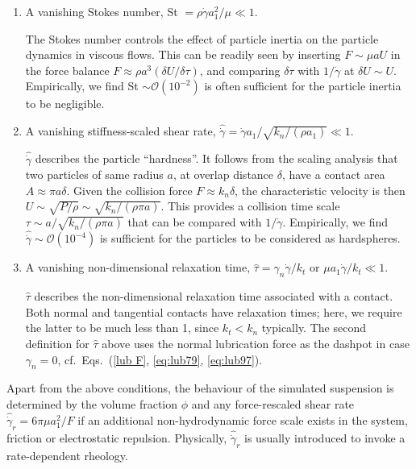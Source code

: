 \begin{enumerate}

\item A vanishing Stokes number, St $=\rho \dot{\gamma} a_1^2/\mu \ll 1$.

  The Stokes number controls the effect of particle inertia on the particle dynamics in viscous flows. This can be readily seen by inserting $F \sim \mu a U$ in the force balance $F \approx \rho a^3 (\delta U/ \delta \tau)$, and comparing $\delta \tau$ with $1/\dot{\gamma}$ at $\delta U \sim U$. Empirically, we find St $\sim \mathcal{O}(10^{-2})$ is often sufficient for the particle inertia to be negligible.
  
\item A vanishing stiffness-scaled shear rate, $\hat{\dot{\gamma}}=\dot{\gamma}a_1/\sqrt{k_n/(\rho a_1)} \ll 1$.

  $\hat{\dot{\gamma}}$ describes the particle ``hardness''. It follows from the scaling analysis that two particles of same radius $a$, at overlap distance $\delta$, have a contact area $A \approx \pi a \delta$. Given the collision force $F \approx k_n \delta$, the characteristic velocity is then $U \sim \sqrt{P/\rho} \sim \sqrt{k_n/(\rho \pi a)}$. This provides a collision time scale $\tau \sim a/\sqrt{k_n/(\rho \pi a)}$ that can be compared with $1/\dot{\gamma}$. Empirically, we find $\hat{\dot{\gamma}} \sim \mathcal{O}(10^{-4})$ is sufficient for the particles to be considered as hardspheres.
  
\item A vanishing non-dimensional relaxation time, $\hat{\tau}=\gamma_n\dot{\gamma}/k_t$ or $\mu a_1 \dot{\gamma}/k_t \ll 1$.

  $\hat{\tau}$ describes the non-dimensional relaxation time associated with a contact. Both normal and tangential contacts have relaxation times; here, we require the latter to be much less than 1, since $k_t < k_n$ typically. The second definition for $\hat{\tau}$ above uses the normal lubrication force as the dashpot in case $\gamma_n=0$, cf.\ Eqs.\ (\ref{lub F}, \ref{eq:lub79}, \ref{eq:lub97}).
  
\end{enumerate}

Apart from the above conditions, the behaviour of the simulated suspension is determined by the volume fraction $\phi$ and any force-rescaled shear rate $\hat{\dot{\gamma}}_r=6\pi\mu a_1^2/F$ if an additional non-hydrodynamic force scale exists in the system, \eg friction or electrostatic repulsion. Physically, $\hat{\dot{\gamma}}_r$ is usually introduced to invoke a rate-dependent rheology.


